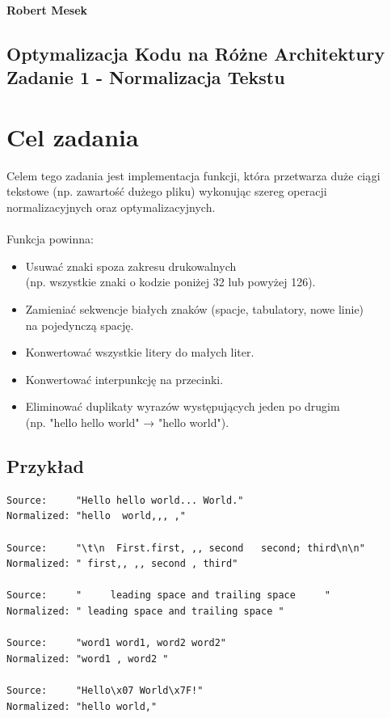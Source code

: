 \documentclass[12pt]{article}
\begin{document}
\textbf{Robert Mesek}\text{,} %
\text{ } %

\begin{center}
	\section*{Optymalizacja Kodu na Różne Architektury \\
	  Zadanie 1 - Normalizacja Tekstu}
	\mbox{}
\end{center}

\section*{Cel zadania}
Celem tego zadania jest implementacja funkcji, która przetwarza duże ciągi
tekstowe (np. zawartość dużego pliku) wykonując szereg operacji normalizacyjnych 
oraz optymalizacyjnych. \\ \\
Funkcja powinna:
\begin{itemize}
	\item Usuwać znaki spoza zakresu drukowalnych \\
	(np. wszystkie znaki o kodzie poniżej 32 lub powyżej 126).
	\item Zamieniać sekwencje białych znaków (spacje, tabulatory, nowe linie) \\
	na pojedynczą spację.
	\item Konwertować wszystkie litery do małych liter.
	\item Konwertować interpunkcję na przecinki.
	\item Eliminować duplikaty wyrazów występujących jeden po drugim \\
	(np. "hello hello world" → "hello world").
\end{itemize}
\subsection*{Przykład}
\begin{verbatim}
Source:     "Hello hello world... World."
Normalized: "hello  world,,, ,"

Source:     "\t\n  First.first, ,, second   second; third\n\n"
Normalized: " first,, ,, second , third"

Source:     "     leading space and trailing space     "
Normalized: " leading space and trailing space "

Source:     "word1 word1, word2 word2"
Normalized: "word1 , word2 "

Source:     "Hello\x07 World\x7F!"
Normalized: "hello world,"
\end{verbatim}
\end{document}
